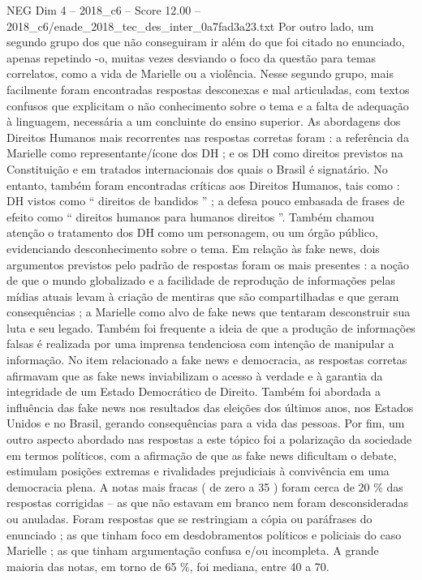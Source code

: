 \begin{textsample}{NEG Dim 4 – 2018\_c6 – Score 12.00 – 2018\_c6/enade\_2018\_tec\_des\_inter\_0a7fad3a23.txt}
Por outro lado, um segundo grupo dos que não conseguiram ir além do que foi citado no enunciado, apenas repetindo -o, muitas vezes desviando o foco da questão para temas correlatos, como a vida de Marielle ou a violência.
Nesse segundo grupo, mais facilmente foram encontradas respostas desconexas e mal articuladas, com textos confusos que explicitam o não conhecimento sobre o tema e a falta de adequação à linguagem, necessária a um concluinte do ensino superior.
As abordagens dos Direitos Humanos mais recorrentes nas respostas corretas foram : a referência da Marielle como representante/ícone dos DH ; e os DH como direitos previstos na Constituição e em tratados internacionais dos quais o Brasil é signatário.
No entanto, também foram encontradas críticas aos Direitos Humanos, tais como : DH vistos como “ direitos de bandidos ” ; a defesa pouco embasada de frases de efeito como “ direitos humanos para humanos direitos ”.
Também chamou atenção o tratamento dos DH como um personagem, ou um órgão público, evidenciando desconhecimento sobre o tema.
Em relação às fake news, dois argumentos previstos pelo padrão de respostas foram os mais presentes : a noção de que o mundo globalizado e a facilidade de reprodução de informações pelas mídias atuais levam à criação de mentiras que são compartilhadas e que geram consequências ; a Marielle como alvo de fake news que tentaram desconstruir sua luta e seu legado.
Também foi frequente a ideia de que a produção de informações falsas é realizada por uma imprensa tendenciosa com intenção de manipular a informação.
No item relacionado a fake news e democracia, as respostas corretas afirmavam que as fake news inviabilizam o acesso à verdade e à garantia da integridade de um Estado Democrático de Direito.
Também foi abordada a influência das fake news nos resultados das eleições dos últimos anos, nos Estados Unidos e no Brasil, gerando consequências para a vida das pessoas.
Por fim, um outro aspecto abordado nas respostas a este tópico foi a polarização da sociedade em termos políticos, com a afirmação de que as fake news dificultam o debate, estimulam posições extremas e rivalidades prejudiciais à convivência em uma democracia plena.
A notas mais fracas ( de zero a 35 ) foram cerca de 20 \% das respostas corrigidas – as que não estavam em branco nem foram desconsideradas ou anuladas.
Foram respostas que se restringiam a cópia ou paráfrases do enunciado ; as que tinham foco em desdobramentos políticos e policiais do caso Marielle ; as que tinham argumentação confusa e/ou incompleta.
A grande maioria das notas, em torno de 65 \%, foi mediana, entre 40 a 70.

\end{textsample}
